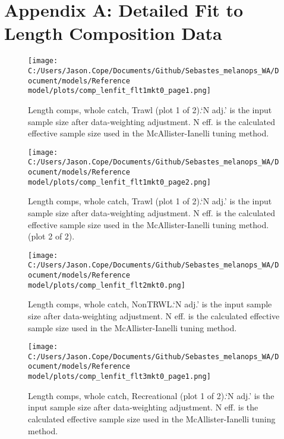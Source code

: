 \documentclass[11pt,
  english,
  letterpaper,
]{article}
\begin{document}
\pagebreak

\clearpage

\hypertarget{app-a}{%
\section{Appendix A: Detailed Fit to Length Composition Data}\label{app-a}}

\begin{figure}
\centering
\texttt{[image: C:/Users/Jason.Cope/Documents/Github/Sebastes\_melanops\_WA/Document/models/Reference model/plots/comp\_lenfit\_flt1mkt0\_page1.png]}
\caption{Length comps, whole catch, Trawl (plot 1 of 2).`N adj.' is the input sample size after data-weighting adjustment. N eff. is the calculated effective sample size used in the McAllister-Ianelli tuning method.\label{fig:comp_lenfit_flt1mkt0_page1}}
\end{figure}

\begin{figure}
\centering
\texttt{[image: C:/Users/Jason.Cope/Documents/Github/Sebastes\_melanops\_WA/Document/models/Reference model/plots/comp\_lenfit\_flt1mkt0\_page2.png]}
\caption{Length comps, whole catch, Trawl (plot 1 of 2).`N adj.' is the input sample size after data-weighting adjustment. N eff. is the calculated effective sample size used in the McAllister-Ianelli tuning method. (plot 2 of 2).\label{fig:comp_lenfit_flt1mkt0_page2}}
\end{figure}

\begin{figure}
\centering
\texttt{[image: C:/Users/Jason.Cope/Documents/Github/Sebastes\_melanops\_WA/Document/models/Reference model/plots/comp\_lenfit\_flt2mkt0.png]}
\caption{Length comps, whole catch, NonTRWL.`N adj.' is the input sample size after data-weighting adjustment. N eff. is the calculated effective sample size used in the McAllister-Ianelli tuning method.\label{fig:comp_lenfit_flt2mkt0}}
\end{figure}

\begin{figure}
\centering
\texttt{[image: C:/Users/Jason.Cope/Documents/Github/Sebastes\_melanops\_WA/Document/models/Reference model/plots/comp\_lenfit\_flt3mkt0\_page1.png]}
\caption{Length comps, whole catch, Recreational (plot 1 of 2).`N adj.' is the input sample size after data-weighting adjustment. N eff. is the calculated effective sample size used in the McAllister-Ianelli tuning method.\label{fig:comp_lenfit_flt3mkt0_page1}}
\end{figure}
\end{document}
